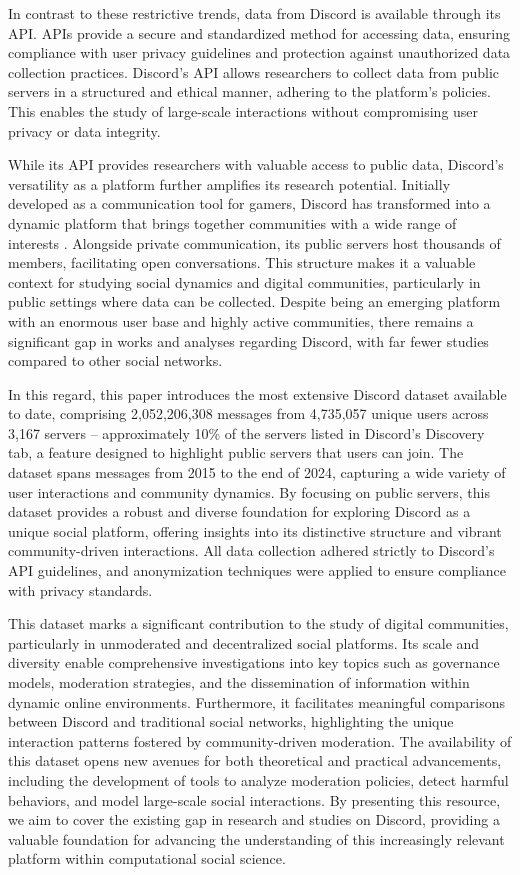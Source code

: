 In contrast to these restrictive trends, data from Discord is available through its API. APIs provide a secure and standardized method for accessing data, ensuring compliance with user privacy guidelines and protection against unauthorized data collection practices. Discord's API allows researchers to collect data from public servers in a structured and ethical manner, adhering to the platform’s policies. This enables the study of large-scale interactions without compromising user privacy or data integrity.

While its API provides researchers with valuable access to public data, Discord’s versatility as a platform further amplifies its research potential. Initially developed as a communication tool for gamers, Discord has transformed into a dynamic platform that brings together communities with a wide range of interests \cite{johnson2022embracing}. Alongside private communication, its public servers host thousands of members, facilitating open conversations. This structure makes it a valuable context for studying social dynamics and digital communities, particularly in public settings where data can be collected. Despite being an emerging platform with an enormous user base and highly active communities, there remains a significant gap in works and analyses regarding Discord, with far fewer studies compared to other social networks.

In this regard, this paper introduces the most extensive Discord dataset available to date, comprising 2,052,206,308 messages from 4,735,057 unique users across 3,167 servers -- approximately 10\% of the servers listed in Discord's Discovery tab, a feature designed to highlight public servers that users can join. The dataset spans messages from 2015 to the end of 2024, capturing a wide variety of user interactions and community dynamics. By focusing on public servers, this dataset provides a robust and diverse foundation for exploring Discord as a unique social platform, offering insights into its distinctive structure and vibrant community-driven interactions. All data collection adhered strictly to Discord's API guidelines, and anonymization techniques were applied to ensure compliance with privacy standards.

This dataset marks a significant contribution to the study of digital communities, particularly in unmoderated and decentralized social platforms. Its scale and diversity enable comprehensive investigations into key topics such as governance models, moderation strategies, and the dissemination of information within dynamic online environments. Furthermore, it facilitates meaningful comparisons between Discord and traditional social networks, highlighting the unique interaction patterns fostered by community-driven moderation. The availability of this dataset opens new avenues for both theoretical and practical advancements, including the development of tools to analyze moderation policies, detect harmful behaviors, and model large-scale social interactions. By presenting this resource, we aim to cover the existing gap in research and studies on Discord, providing a valuable foundation for advancing the understanding of this increasingly relevant platform within computational social science.



